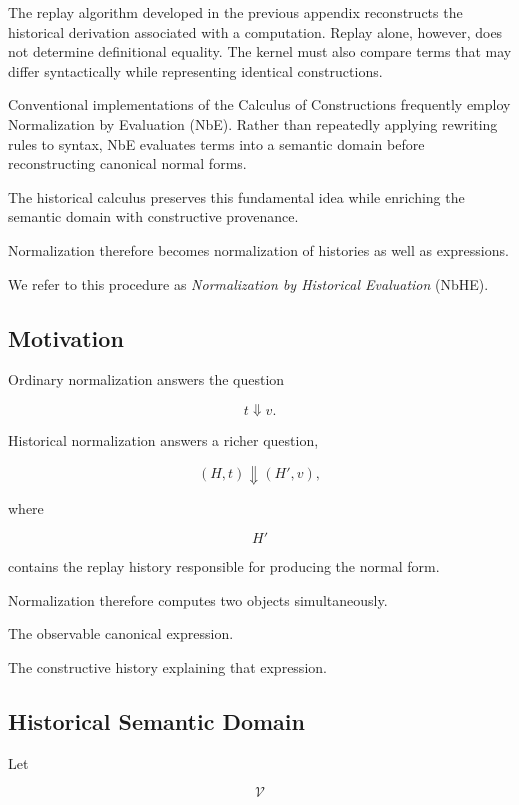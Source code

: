 \documentclass[12pt,oneside]{article}
\theoremstyle{definition}
\theoremstyle{remark}
\begin{document}
The replay algorithm developed in the previous appendix reconstructs the
historical derivation associated with a computation. Replay alone, however, does
not determine definitional equality. The kernel must also compare terms that may
differ syntactically while representing identical constructions.

Conventional implementations of the Calculus of Constructions frequently employ
Normalization by Evaluation (NbE). Rather than repeatedly applying rewriting
rules to syntax, NbE evaluates terms into a semantic domain before
reconstructing canonical normal forms.

The historical calculus preserves this fundamental idea while enriching the
semantic domain with constructive provenance.

Normalization therefore becomes normalization of histories as well as
expressions.

We refer to this procedure as \emph{Normalization by Historical Evaluation}
(NbHE).


\subsection{Motivation}

Ordinary normalization answers the question

\[
t
\Downarrow
v.
\]

Historical normalization answers a richer question,

\[
(H,t)
\Downarrow
(H',v),
\]

where

\[
H'
\]

contains the replay history responsible for producing the normal form.

Normalization therefore computes two objects simultaneously.

The observable canonical expression.

The constructive history explaining that expression.


\subsection{Historical Semantic Domain}

Let

\[
\mathcal V
\]
\end{document}
